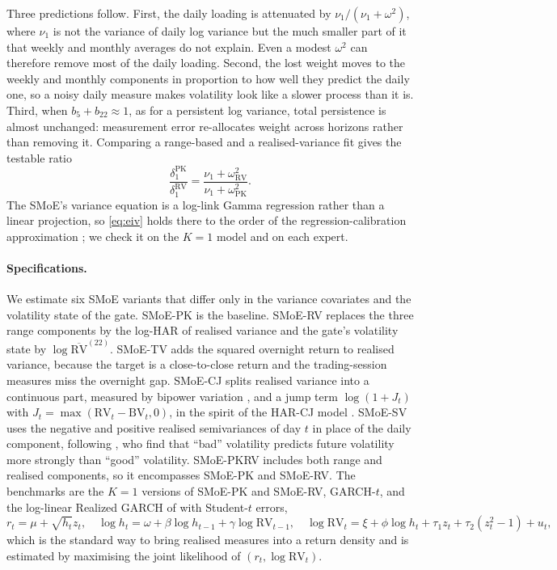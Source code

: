 \noindent Three predictions follow. First, the daily loading is attenuated by
$\nu_1/(\nu_1+\omega^2)$, where $\nu_1$ is not the variance of daily log variance but the much smaller
part of it that weekly and monthly averages do not explain. Even a modest $\omega^2$ can therefore
remove most of the daily loading. Second, the lost weight moves to the weekly and monthly components
in proportion to how well they predict the daily one, so a noisy daily measure makes volatility look
like a slower process than it is. Third, when $b_5+b_{22}\approx1$, as for a persistent log variance,
total persistence is almost unchanged: measurement error re-allocates weight across horizons rather
than removing it. Comparing a range-based and a realised-variance fit gives the testable ratio
\begin{equation}\label{eq:eiv-ratio}
  \frac{\delta_1^{\mathrm{PK}}}{\delta_1^{\mathrm{RV}}}=\frac{\nu_1+\omega^2_{\mathrm{RV}}}{\nu_1+\omega^2_{\mathrm{PK}}}.
\end{equation}
The SMoE's variance equation is a log-link Gamma regression rather than a linear projection, so
\eqref{eq:eiv} holds there to the order of the regression-calibration approximation
\citep{carroll2006measurement}; we check it on the $K=1$ model and on each expert.

\paragraph{Specifications.}
We estimate six SMoE variants that differ only in the variance covariates and the volatility
state of the gate. SMoE-PK is the baseline. SMoE-RV replaces the three range components by the
log-HAR of realised variance and the gate's volatility state by $\log\overline{\mathrm{RV}}^{(22)}$.
SMoE-TV adds the squared overnight return to realised variance, because the target is a
close-to-close return and the trading-session measures miss the overnight gap. SMoE-CJ splits
realised variance into a continuous part, measured by bipower variation \citep{barndorff2004power},
and a jump term $\log(1+J_t)$ with $J_t=\max(\mathrm{RV}_t-\mathrm{BV}_t,0)$, in the spirit of the
HAR-CJ model \citep{andersen2007roughing,corsi2010threshold}. SMoE-SV uses the negative and positive
realised semivariances of day $t$ in place of the daily component, following \citet{patton2015good},
who find that ``bad'' volatility predicts future volatility more strongly than ``good'' volatility.
SMoE-PKRV includes both range and realised components, so it encompasses SMoE-PK and SMoE-RV. The
benchmarks are the $K=1$ versions of SMoE-PK and SMoE-RV, GARCH-$t$, and the log-linear Realized
GARCH of \citet{hansen2012realized} with Student-$t$ errors,
\begin{equation}\label{eq:rgarch}
  r_t=\mu+\sqrt{h_t}z_t,\quad \log h_t=\omega+\beta\log h_{t-1}+\gamma\log\mathrm{RV}_{t-1},\quad
  \log\mathrm{RV}_t=\xi+\phi\log h_t+\tau_1z_t+\tau_2(z_t^2-1)+u_t,
\end{equation}
which is the standard way to bring realised measures into a return density and is estimated by
maximising the joint likelihood of $(r_t,\log\mathrm{RV}_t)$.

